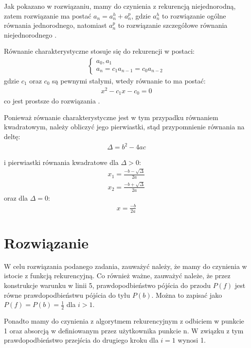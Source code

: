 \documentclass[12pt,oneside,a4paper]{book} %
\theoremstyle{break}
\begin{document}
Jak pokazano w rozwiązaniu, mamy do czynienia z rekurencją niejednorodną, zatem rozwiązanie ma postać $a_n=a_n^h+a_n^p$, gdzie $a_n^h$ to rozwiązanie ogólne równania jednorodnego, natomiast $a_n^p$ to rozwiązanie szczegółowe równania niejednorodnego \cite{KwasnyRekurencja}.

Równanie charakterystyczne stosuje się do rekurencji w postaci:
\begin{align*}
  \begin{cases}
    a_0,a_1\\
    a_n=c_1a_{n-1}=c_0a_{n-2}
  \end{cases}
\end{align*}
gdzie $c_1$ oraz $c_0$ są pewnymi stałymi, wtedy równanie to ma postać:
\begin{align*}
  x^2-c_1x-c_0=0
\end{align*}
co jest prostsze do rozwiązania \cite{BorowskaAlgorytmy}.

Ponieważ równanie charakterystyczne jest w tym przypadku równaniem kwadratowym, należy obliczyć jego pierwiastki, stąd przypomnienie równania na deltę:
\begin{align*}
  \Delta=b^2-4ac
\end{align*}

i pierwiastki równania kwadratowe dla $\Delta > 0$:
\begin{align*}
  x_1=\frac{-b-\sqrt{\Delta}}{2a}\\
  x_2=\frac{-b+\sqrt{\Delta}}{2a}
\end{align*}
oraz dla $\Delta=0$:
\begin{align*}
  x=\frac{-b}{2a}
\end{align*}


\chapter*{Rozwiązanie}

W celu rozwiązania podanego zadania, zauważyć należy, że mamy do czynienia w istocie z funkcją rekurencyjną. Co również ważne, zauważyć należe, że przez konstrukcje warunku w linii 5, prawdopodbieństwo pójścia do przodu $P(f)$ jest równe prawdopodbieństwu pójścia do tyłu $P(b)$. Można to zapisać jako $P(f)=P(b)=\frac{1}{2}$ dla $i > 1$.

Ponadto mamy do czynienia z algorytmem rekurencyjnym z odbiciem w punkcie 1 oraz absorcją w definiowanym przez użytkownika punkcie n. W związku z tym prawdopodbieństwo przejścia do drugiego kroku dla $i=1$ wynosi 1.
\end{document}
